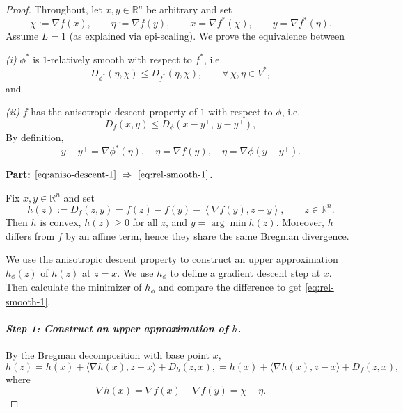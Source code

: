 \documentclass{article}
\newcommand{\dual}[1]{\left\langle {#1} \right\rangle}
\theoremstyle{plain}
\theoremstyle{definition}
\theoremstyle{remark}
\begin{document}
\begin{proof}
Throughout, let $x,y\in\mathbb{R}^n$ be arbitrary and set
\[
\chi:=\nabla f(x),\qquad \eta:=\nabla f(y),
\qquad x=\nabla f^*(\chi),\qquad y=\nabla f^*(\eta).
\]
Assume $L=1$ (as explained via epi-scaling). We prove the equivalence between

\smallskip
\noindent\emph{(i)} $\phi^*$ is $1$-relatively smooth with respect to $f^*$, i.e.
\begin{equation}\label{eq:rel-smooth-1}
D_{\phi^*}(\eta, \chi)\le D_{f^*}(\eta, \chi),\qquad \forall\,\chi,\eta\in V^*,
\end{equation}
and

\smallskip
\noindent\emph{(ii)} $f$ has the anisotropic descent property of $1$ with respect to $\phi$, i.e.
\begin{equation}\label{eq:aniso-descent-1}
D_f(x,y)\le D_{\phi}(x-y^+,\,y-y^+),
\end{equation}
By definition,
\[
y-y^+ = \nabla \phi^*(\eta), \quad \eta = \nabla f(y), \quad \eta = \nabla \phi(y-y^+).
\]

{\bf Part: $\eqref{eq:aniso-descent-1}\ \Rightarrow\ \eqref{eq:rel-smooth-1}$.}


Fix $x,y\in\mathbb{R}^n$ and set
\[
h(z):=D_f(z,y) = f(z) - f(y) - \dual{\nabla f(y), z - y},\qquad z\in\mathbb{R}^n.
\]
Then $h$ is convex, $h(z)\ge 0$ for all $z$, and $y = \arg\min h(z)$.
Moreover, $h$ differs from $f$ by an affine term, hence they share the same Bregman divergence.

We use the anisotropic descent property to construct an upper approximation $h_{\phi}(z)$ of $h(z)$ at $z = x$. We use $h_{\phi}$ to define a gradient descent step at $x$. Then calculate the minimizer of $h_{\phi}$ and compare the difference to get \eqref{eq:rel-smooth-1}.

\medskip

\paragraph{\em Step 1: Construct an upper approximation of $h$.}
By the Bregman decomposition with base point $x$,
\begin{equation}\label{eq:h-bregman}
h(z)
=
h(x)+\langle \nabla h(x),z-x\rangle + D_h(z,x),
=
h(x)+\langle \nabla h(x),z-x\rangle + D_f(z,x),
\end{equation}
where
\[
\nabla h(x)=\nabla f(x)-\nabla f(y)=\chi - \eta.
\]


\end{proof}
\end{document}
